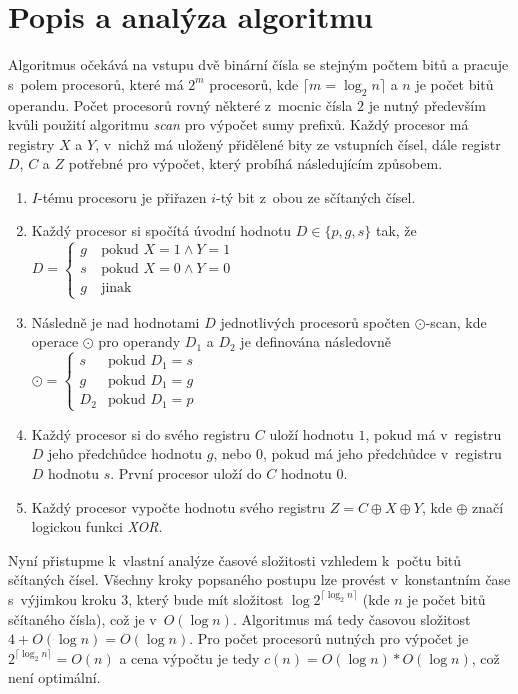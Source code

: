 \documentclass[a4paper, 12pt]{article}
\begin{document}
\section{Popis a analýza algoritmu}
\label{sec:analysis}
Algoritmus očekává na vstupu dvě binární čísla se stejným počtem bitů a pracuje s~polem
procesorů, které má $2^m$ procesorů, kde $\lceil m=\log_{2}{n} \rceil$ a $n$ je počet bitů operandu.
Počet procesorů rovný některé z~mocnic čísla $2$ je nutný především kvůli použití algoritmu \emph{scan}
pro výpočet sumy prefixů.
Každý procesor má registry $X$ a $Y$, v~nichž má uložený přidělené bity ze vstupních čísel,
dále registr $D$, $C$ a $Z$ potřebné pro výpočet, který probíhá následujícím způsobem.
\begin{enumerate}
    \item $I$-tému procesoru je přiřazen $i$-tý bit z~obou ze sčítaných čísel.
    \item Každý procesor si spočítá úvodní hodnotu $D\in \{p,g,s\}$ tak, že $D=
        \left\{
        \begin{array}{ll}
             g & \mbox{pokud } X=1 \wedge Y=1 \\
             s~& \mbox{pokud } X=0 \wedge Y=0 \\
             g & \mbox{jinak}
        \end{array}
        \right.
        $
    \item Následně je nad hodnotami $D$ jednotlivých procesorů spočten $\odot$-scan, kde
        operace $\odot$ pro operandy $D_1$ a $D_2$ je definována následovně $\odot=
        \left\{
        \begin{array}{ll}
             s~& \mbox{pokud } D_1=s \\
             g~& \mbox{pokud } D_1=g \\
             D_2 & \mbox{pokud } D_1=p
        \end{array}
        \right.
        $
    \item Každý procesor si do svého registru $C$ uloží hodnotu $1$, pokud má v~registru $D$ jeho
    předchůdce hodnotu $g$, nebo $0$, pokud má jeho předchůdce v~registru $D$ hodnotu $s$.
    První procesor uloží do $C$ hodnotu $0$.
    \item Každý procesor vypočte hodnotu svého registru $Z=C\oplus X \oplus Y$, kde $\oplus$
    značí logickou funkci \emph{XOR}.
\end{enumerate}
Nyní přistupme k~vlastní analýze časové složitosti vzhledem k~počtu bitů sčítaných čísel.
Všechny kroky popsaného postupu lze provést v~konstantním čase s~výjimkou kroku $3$, který
bude mít složitost $\log{2^{\lceil \log_{2}{n} \rceil}}$ (kde $n$ je počet bitů sčítaného čísla), což
je v~$O(\log{n})$.
Algoritmus má tedy časovou složitost $4+O(\log{n})=O(\log{n})$.
Pro počet procesorů nutných pro výpočet je $2^{\lceil \log_{2}{n} \rceil}=O(n)$
a cena výpočtu je tedy $c(n)=O(\log{n})*O(\log{n})$, což není optimální.
\end{document}
